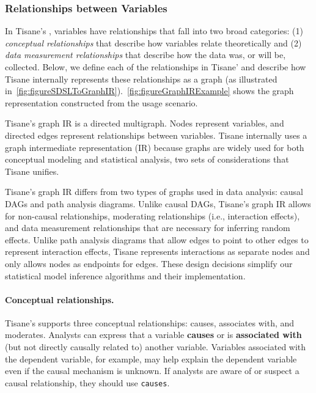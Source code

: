 \subsubsection{Relationships between Variables}
In Tisane's \SDSL, variables have relationships that fall into two broad
categories: (1) \textit{conceptual relationships} that describe how variables
relate theoretically and (2) \textit{data measurement relationships} that
describe how the data was, or will be, collected. Below, we define each of the
relationships in Tisane' \SDSL and describe how Tisane
internally represents these relationships as a graph (as illustrated
in~\ref{fig:figureSDSLToGraphIR}).~\ref{fig:figureGraphIRExample} shows
the graph representation constructed from the usage scenario.

Tisane's graph IR is a %
directed multigraph.
Nodes
represent variables, and directed edges represent relationships between
variables. Tisane internally uses a graph intermediate representation (IR) because graphs are widely
used for both conceptual modeling and statistical analysis, two sets of
considerations that Tisane unifies.

Tisane's graph IR differs from two types of graphs
used in data analysis: causal DAGs and path analysis diagrams. Unlike
causal DAGs, Tisane's graph IR allows for non-causal relationships, moderating relationships
(i.e., interaction effects), and data measurement relationships that
are necessary for inferring random effects. Unlike path analysis diagrams that
allow edges to point to other edges to represent
interaction effects,
Tisane represents interactions as separate nodes and only allows nodes as endpoints
for edges. These design decisions simplify our statistical model
inference algorithms and their implementation.


\paragraph{Conceptual relationships.}

Tisane's \SDSL supports three conceptual relationships: causes, associates with,
and moderates. Analysts can express that a variable \textbf{causes} or is
\textbf{associated with} (but not directly causally related to) another variable.
Variables associated with the dependent variable, for example, may help explain
the dependent variable even if the causal mechanism is unknown. If analysts are
aware of or suspect a causal relationship, they should use
\texttt{causes}.

